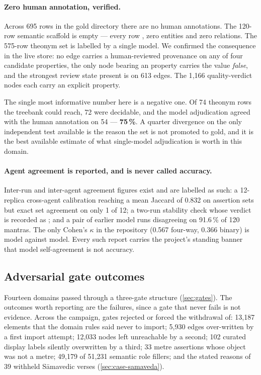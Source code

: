 \paragraph{Zero human annotation, verified.} Across 695 rows in the gold directory
there are no human annotations. The 120-row semantic scaffold is empty --- every row
, zero entities and zero relations. The 575-row theonym set is
labelled  by a single model. We confirmed the consequence in
the live store: no edge carries a human-reviewed provenance on any of four candidate
properties, the only node bearing an  property carries the value
\emph{false}, and the strongest review state present is  on
613 edges. The 1{,}166 quality-verdict nodes each carry an explicit
 property.

The single most informative number here is a negative one. Of 74 theonym rows the
treebank could reach, 72 were decidable, and the model adjudication agreed with the
human annotation on 54 --- \textbf{75\,\%}. A quarter divergence on the only
independent test available is the reason the set is not promoted to gold, and it is
the best available estimate of what single-model adjudication is worth in this
domain.

\paragraph{Agent agreement is reported, and is never called accuracy.} Inter-run and
inter-agent agreement figures exist and are labelled as such: a 12-replica
cross-agent calibration reaching a mean Jaccard of 0.832 on assertion sets but exact
set agreement on only 1 of 12; a two-run stability check whose verdict is recorded as
; and a pair of earlier model runs
disagreeing on 91.6\,\% of 120 mantras. The only Cohen's $\kappa$ in the repository
(0.567 four-way, 0.366 binary) is model against model. Every such report carries the
project's standing banner that model self-agreement is not accuracy.

\subsection{Adversarial gate outcomes}
\label{sec:eval-gates}

Fourteen domains passed through a three-gate structure (\cref{sec:gates}). The
outcomes worth reporting are the failures, since a gate that never fails is not
evidence. Across the campaign, gates rejected or forced the withdrawal of: 13{,}187
elements that the domain rules said never to import; 5{,}930 edges over-written by a
first import attempt; 12{,}033 nodes left unreachable by a second; 102 curated
display labels silently overwritten by a third; 33 metre assertions whose object was
not a metre; 49{,}179 of 51{,}231 semantic role fillers; and the stated reasons of 39
withheld S\=amavedic verses (\cref{sec:case-samaveda}).

